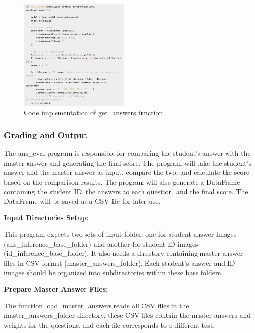 \documentclass[twocolumn]{article}
\begin{document}
        \begin{figure}[ht]
            \centering
            \includegraphics[width=0.48\textwidth]{get_ans_code.png}
            \caption{Code implementation of get\_answers function}
            \label{fig:get_ans_code}
        \end{figure}

        \subsubsection{Grading and Output}

        The ans\_eval program is responsible for comparing the student's answer with the master answer and generating the final score. The program will take the student's answer and the master answer as input, compare the two, and calculate the score based on the comparison results. The program will also generate a DataFrame containing the student ID, the answers to each question, and the final score. The DataFrame will be saved as a CSV file for later use.

        \textbf{Input Directories Setup:}

        This program expects two sets of input folder: one for student answer images (ans\_inference\_base\_folder) and another for student ID images (id\_inference\_base\_folder). It also needs a directory containing master answer files in CSV format (master\_answers\_folder).
        Each student's answer and ID images should be organized into subdirectories within these base folders.

        \textbf{Prepare Master Answer Files:}

        The function load\_master\_answers reads all CSV files in the master\_answers\_folder directory, these CSV files contain the master answers and weights for the questions, and each file corresponds to a different test.
\end{document}
